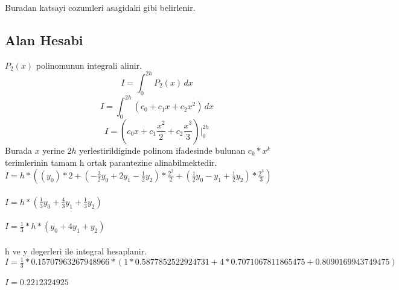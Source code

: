 \documentclass{article}
\begin{document}
\setlength\parindent{0pt}
Buradan katsayi cozumleri asagidaki gibi belirlenir.\\
\subsection{Alan Hesabi}
$P_{2}(x)$ polinomunun integrali alinir.\\
\[ I=\int_{0}^{2h} P_{2}(x) \,dx \]
\[ I=\int_{0}^{2h} (c_{0}+c_{1}x+c_{2}x^{2}) \,dx \]
\[ I=(c_{0}x+c_{1}\frac{x^{2}}{2}+c_{2}\frac{x^{3}}{3})\bigg\vert_{0}^{2h} \]
Burada $x$ yerine $2h$ yerlestirildiginde polinom ifadesinde bulunan $c_{k}*x^{k}$ terimlerinin tamam h ortak parantezine alinabilmektedir.\\
$\displaystyle I=h*((y_{0})*2+(-\frac{3}{2}y_{0}+2y_{1}-\frac{1}{2}y_{2})*\frac{2^{2}}{2}+(\frac{1}{2}y_{0}-y_{1}+\frac{1}{2}y_{2})*\frac{2^{3}}{3})$\\\\
$\displaystyle I=h*(\frac{1}{3}y_{0}+\frac{4}{3}y_{1}+\frac{1}{3}y_{2})$\\\\
$\displaystyle I=\frac{1}{3}*h*(y_{0}+4y_{1}+y_{2})$\\\\
h ve y degerleri ile integral hesaplanir.\\
$\displaystyle I=\frac{1}{3}*0.15707963267948966*(1*0.5877852522924731+4*0.7071067811865475+0.8090169943749475)$\\\\
$\displaystyle I=0.2212324925$\\\\
\end{document}
